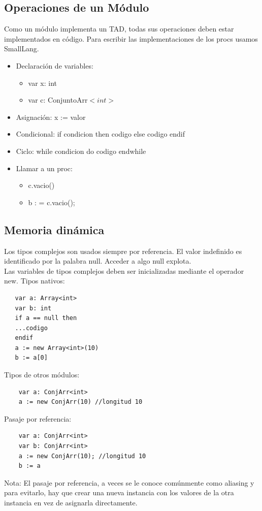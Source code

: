 \documentclass[10pt,a4paper]{article}
\begin{document}
\subsection*{Operaciones de un Módulo}
Como un módulo implementa un TAD, todas sus operaciones deben estar implementados en código.
Para escribir las implementaciones de los procs usamos SmallLang.
\begin{itemize}
    \item Declaración de variables: 
    \begin{itemize}
        \item var x: int
        \item var c: ConjuntoArr$<int>$
    \end{itemize}
    \item Asignación: x := valor
    \item Condicional: if condicion then codigo else codigo endif
    \item Ciclo: while condicion do codigo endwhile
    \item Llamar a un proc:
    \begin{itemize}
        \item c.vacio()
        \item b : = c.vacio();
    \end{itemize}
\end{itemize}
\subsection*{Memoria dinámica}
Los tipos complejos son usados siempre por referencia. El valor indefinido es identificado por la palabra null. Acceder a algo null explota. \\
Las variables de tipos complejos deben ser inicializadas mediante el operador new.
Tipos nativos: 
\begin{lstlisting}
   var a: Array<int>
   var b: int
   if a == null then 
   ...codigo
   endif
   a := new Array<int>(10)
   b := a[0]
\end{lstlisting}
Tipos de otros módulos: 
\begin{lstlisting}
    var a: ConjArr<int>
    a := new ConjArr(10) //longitud 10
\end{lstlisting}
Pasaje por referencia:
\begin{lstlisting}
    var a: ConjArr<int>
    var b: ConjArr<int>
    a := new ConjArr(10); //longitud 10
    b := a
\end{lstlisting}
Nota: El pasaje por referencia, a veces se le conoce comúnmente como aliasing y para evitarlo, hay que crear una nueva instancia con los valores de la otra instancia en vez de asignarla directamente.
\end{document}
